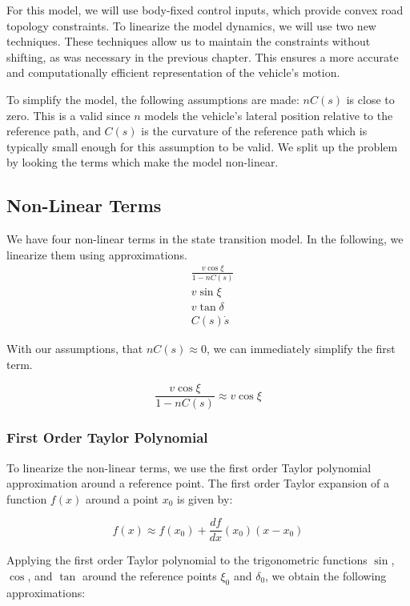 For this model, we will use body-fixed control inputs, which provide convex road topology constraints.
To linearize the model dynamics, we will use two new techniques.
These techniques allow us to maintain the constraints without shifting, as was necessary in the previous chapter.
This ensures a more accurate and computationally efficient representation of the vehicle's motion.

To simplify the model, the following assumptions are made: $nC(s)$ is close to zero.
This is a valid since $n$ models the vehicle's lateral position relative to the reference path, and $C(s)$ is the curvature of the reference path
which is typically small enough for this assumption to be valid.
We split up the problem by looking the terms which make the model non-linear.

\subsection{Non-Linear Terms}

We have four non-linear terms in the state transition model.
In the following, we linearize them using approximations.
\begin{align}
	 & \frac{v \cos\xi}{1 - nC(s)} \\
	 & v \sin\xi                   \\
	 & v \tan\delta                \\
	 & C(s)\dot{s}
\end{align}

With our assumptions, that $nC(s)\approx 0$, we can immediately simplify the first term.

\[
	\frac{v \cos\xi}{1 - nC(s)} \approx v \cos\xi
\]

\subsubsection{First Order Taylor Polynomial}

To linearize the non-linear terms, we use the first order Taylor polynomial approximation around a reference point.
The first order Taylor expansion of a function \(f(x)\) around a point \(x_0\) is given by:

\[ f(x) \approx f(x_0) +
	\frac{df}{dx} (x_0) (x - x_0) \]

Applying the first order Taylor polynomial to the trigonometric functions $\sin$, $\cos$, and
$\tan$ around the reference points $\xi_0$ and $\delta_0$, we obtain the following approximations:

